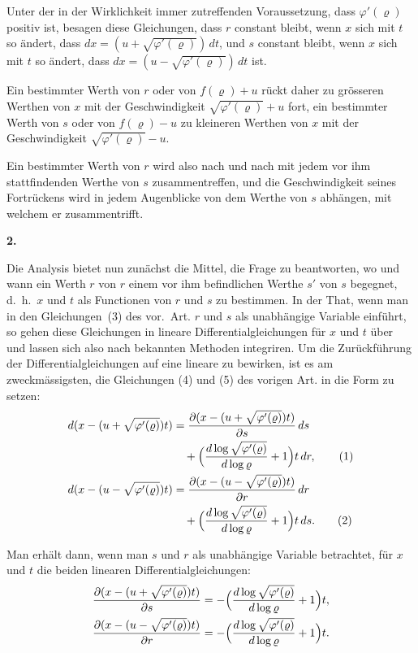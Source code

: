 \documentclass[12pt,a4paper]{book}
\theoremstyle{definition}
\theoremstyle{remark}
\begin{document}
Unter der in der Wirklichkeit immer zutreffenden Voraussetzung, dass $\varphi'(\varrho)$ positiv ist, besagen diese Gleichungen, dass $r$ constant bleibt, wenn $x$ sich mit $t$ so \"andert, dass $dx = (u + \sqrt{\varphi'(\varrho)})\,dt$, und $s$ constant bleibt, wenn $x$ sich mit $t$ so \"andert, dass $dx = (u - \sqrt{\varphi'(\varrho)})\,dt$ ist.

Ein bestimmter Werth von $r$ oder von $f(\varrho) + u$ r\"uckt daher zu gr\"osseren Werthen von $x$ mit der Geschwindigkeit $\sqrt{\varphi'(\varrho)} + u$ fort, ein bestimmter Werth von $s$ oder von $f(\varrho) - u$ zu kleineren Werthen von $x$ mit der Geschwindigkeit $\sqrt{\varphi'(\varrho)} - u$.

Ein bestimmter Werth von $r$ wird also nach und nach mit jedem vor ihm stattfindenden Werthe von $s$ zusammentreffen, und die Geschwindigkeit seines Fortr\"uckens wird in jedem Augenblicke von dem Werthe von $s$ abh\"angen, mit welchem er zusammentrifft.

\newpage
\begin{center}
\textbf{2.}
\end{center}

Die Analysis bietet nun zun\"achst die Mittel, die Frage zu beantworten, wo und wann ein Werth $r$ von $r$ einem vor ihm befindlichen Werthe $s'$ von $s$ begegnet, d.~h.~$x$ und $t$ als Functionen von $r$ und $s$ zu bestimmen. In der That, wenn man in den Gleichungen~(3) des vor.~Art. $r$ und $s$ als unabh\"angige Variable einf\"uhrt, so gehen diese Gleichungen in lineare Differentialgleichungen f\"ur $x$ und $t$ \"uber und lassen sich also nach bekannten Methoden integriren. Um die Zur\"uckf\"uhrung der Differentialgleichungen auf eine lineare zu bewirken, ist es am zweckm\"assigsten, die Gleichungen (4) und (5) des vorigen Art. in die Form zu setzen:
\begin{align*}
d(x - (u + \sqrt{\varphi'(\varrho)})t) &= \frac{\partial(x - (u + \sqrt{\varphi'(\varrho)})t)}{\partial s}\,ds\\
&\quad + \Bigl(\frac{d\log\sqrt{\varphi'(\varrho)}}{d\log\varrho} + 1\Bigr)t\,dr,\tag{1}\\
d(x - (u - \sqrt{\varphi'(\varrho)})t) &= \frac{\partial(x - (u - \sqrt{\varphi'(\varrho)})t)}{\partial r}\,dr\\
&\quad + \Bigl(\frac{d\log\sqrt{\varphi'(\varrho)}}{d\log\varrho} + 1\Bigr)t\,ds.\tag{2}
\end{align*}

Man erh\"alt dann, wenn man $s$ und $r$ als unabh\"angige Variable betrachtet, f\"ur $x$ und $t$ die beiden linearen Differentialgleichungen:
\begin{align*}
\frac{\partial(x - (u + \sqrt{\varphi'(\varrho)})t)}{\partial s} &= -\Bigl(\frac{d\log\sqrt{\varphi'(\varrho)}}{d\log\varrho} + 1\Bigr)t,\\
\frac{\partial(x - (u - \sqrt{\varphi'(\varrho)})t)}{\partial r} &= -\Bigl(\frac{d\log\sqrt{\varphi'(\varrho)}}{d\log\varrho} + 1\Bigr)t.
\end{align*}
\end{document}
